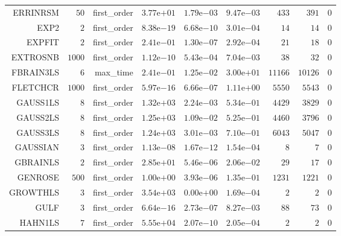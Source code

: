 \begin{longtable}{rrrrrrrrr}
ERRINRSM & \(    50\) & first\_order & \( 3.77\)e\(+01\) & \( 1.79\)e\(-03\) & \( 9.47\)e\(-03\) & \(   433\) & \(   391\) & \(     0\) \\
EXP2 & \(     2\) & first\_order & \( 8.38\)e\(-19\) & \( 6.68\)e\(-10\) & \( 3.01\)e\(-04\) & \(    14\) & \(    14\) & \(     0\) \\
EXPFIT & \(     2\) & first\_order & \( 2.41\)e\(-01\) & \( 1.30\)e\(-07\) & \( 2.92\)e\(-04\) & \(    21\) & \(    18\) & \(     0\) \\
EXTROSNB & \(  1000\) & first\_order & \( 1.12\)e\(-10\) & \( 5.43\)e\(-04\) & \( 7.04\)e\(-03\) & \(    38\) & \(    32\) & \(     0\) \\
FBRAIN3LS & \(     6\) & max\_time & \( 2.41\)e\(-01\) & \( 1.25\)e\(-02\) & \( 3.00\)e\(+01\) & \( 11166\) & \( 10126\) & \(     0\) \\
FLETCHCR & \(  1000\) & first\_order & \( 5.97\)e\(-16\) & \( 6.66\)e\(-07\) & \( 1.11\)e\(+00\) & \(  5550\) & \(  5543\) & \(     0\) \\
GAUSS1LS & \(     8\) & first\_order & \( 1.32\)e\(+03\) & \( 2.24\)e\(-03\) & \( 5.34\)e\(-01\) & \(  4429\) & \(  3829\) & \(     0\) \\
GAUSS2LS & \(     8\) & first\_order & \( 1.25\)e\(+03\) & \( 1.09\)e\(-02\) & \( 5.25\)e\(-01\) & \(  4460\) & \(  3796\) & \(     0\) \\
GAUSS3LS & \(     8\) & first\_order & \( 1.24\)e\(+03\) & \( 3.01\)e\(-03\) & \( 7.10\)e\(-01\) & \(  6043\) & \(  5047\) & \(     0\) \\
GAUSSIAN & \(     3\) & first\_order & \( 1.13\)e\(-08\) & \( 1.67\)e\(-12\) & \( 1.54\)e\(-04\) & \(     8\) & \(     7\) & \(     0\) \\
GBRAINLS & \(     2\) & first\_order & \( 2.85\)e\(+01\) & \( 5.46\)e\(-06\) & \( 2.06\)e\(-02\) & \(    29\) & \(    17\) & \(     0\) \\
GENROSE & \(   500\) & first\_order & \( 1.00\)e\(+00\) & \( 3.93\)e\(-06\) & \( 1.35\)e\(-01\) & \(  1231\) & \(  1221\) & \(     0\) \\
GROWTHLS & \(     3\) & first\_order & \( 3.54\)e\(+03\) & \( 0.00\)e\(+00\) & \( 1.69\)e\(-04\) & \(     2\) & \(     2\) & \(     0\) \\
GULF & \(     3\) & first\_order & \( 6.64\)e\(-16\) & \( 2.73\)e\(-07\) & \( 8.27\)e\(-03\) & \(    88\) & \(    73\) & \(     0\) \\
HAHN1LS & \(     7\) & first\_order & \( 5.55\)e\(+04\) & \( 2.07\)e\(-10\) & \( 2.05\)e\(-04\) & \(     2\) & \(     2\) & \(     0\) \\

\end{longtable}

